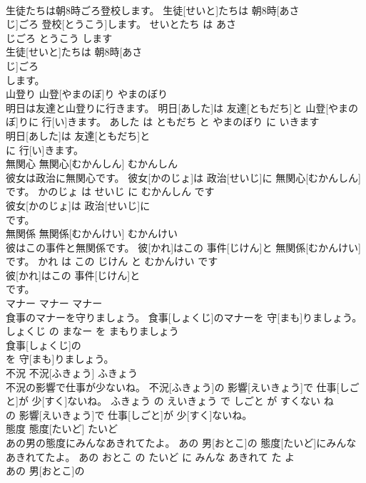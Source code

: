 \documentclass[8pt]{extreport}
\begin{document}
\begin{CJK}{UTF8}{min}
\\	生徒たちは朝8時ごろ登校します。	生徒[せいと]たちは 朝8時[あさ 
\\	じ]ごろ 登校[とうこう]します。	せいとたち は あさ 
\\	じごろ とうこう します	
\\	生徒[せいと]たちは 朝8時[あさ 
\\	じ]ごろ
\\	します。			
\\	山登り	山登[やまのぼ]り	やまのぼり	
\\	明日は友達と山登りに行きます。	明日[あした]は 友達[ともだち]と 山登[やまのぼ]りに 行[い]きます。	あした は ともだち と やまのぼり に いきます	
\\	明日[あした]は 友達[ともだち]と
\\	に 行[い]きます。			
\\	無関心	無関心[むかんしん]	むかんしん	
\\	彼女は政治に無関心です。	彼女[かのじょ]は 政治[せいじ]に 無関心[むかんしん]です。	かのじょ は せいじ に むかんしん です	
\\	彼女[かのじょ]は 政治[せいじ]に
\\	です。			
\\	無関係	無関係[むかんけい]	むかんけい	
\\	彼はこの事件と無関係です。	彼[かれ]はこの 事件[じけん]と 無関係[むかんけい]です。	かれ は この じけん と むかんけい です	
\\	彼[かれ]はこの 事件[じけん]と
\\	です。			
\\	マナー	マナー	マナー	
\\	食事のマナーを守りましょう。	食事[しょくじ]のマナーを 守[まも]りましょう。	しょくじ の まなー を まもりましょう	
\\	食事[しょくじ]の
\\	を 守[まも]りましょう。			
\\	不況	不況[ふきょう]	ふきょう	
\\	不況の影響で仕事が少ないね。	不況[ふきょう]の 影響[えいきょう]で 仕事[しごと]が 少[すく]ないね。	ふきょう の えいきょう で しごと が すくない ね	
\\	の 影響[えいきょう]で 仕事[しごと]が 少[すく]ないね。			
\\	態度	態度[たいど]	たいど	
\\	あの男の態度にみんなあきれてたよ。	あの 男[おとこ]の 態度[たいど]にみんなあきれてたよ。	あの おとこ の たいど に みんな あきれて た よ	
\\	あの 男[おとこ]の

\end{CJK}
\end{document}
